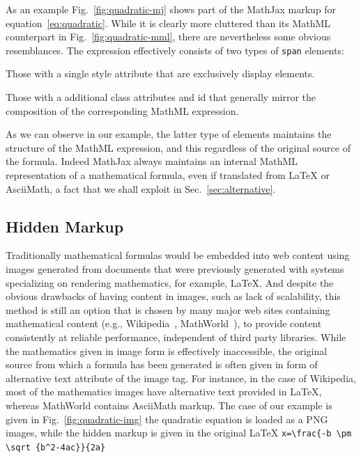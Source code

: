 \documentclass{sig-alternate}
\begin{document}
As an example Fig.~\ref{fig:quadratic-mj} shows part of the MathJax markup for
equation~\ref{eq:quadratic}. While it is clearly more cluttered than its MathML
counterpart in Fig.~\ref{fig:quadratic-mml}, there are nevertheless some obvious
resemblances. The expression effectively consists of two types of \texttt{span}
elements:
\begin{inparaenum}[(a)]
\item Those with a single style attribute that are exclusively display elements.
\item Those with a additional class attributes and id that generally mirror the
  composition of the corresponding MathML expression.
\end{inparaenum}
As we can observe in our example, the latter type of elements maintains the
structure of the MathML expression, and this regardless of the original source
of the formula. Indeed MathJax always maintains an internal MathML
representation of a mathematical formula, even if translated from {\LaTeX} or
AsciiMath, a fact that we shall exploit in Sec.~\ref{sec:alternative}.


\subsection{Hidden Markup}\label{sec:images}

Traditionally mathematical formulas would be embedded into web content using
images generated from documents that were previously generated with systems
specializing on rendering mathematics, for example, {\LaTeX}. And despite the
obvious drawbacks of having content in images, such as lack of scalability, this
method is still an option that is chosen by many major web sites containing
mathematical content (e.g., Wikipedia~\cite{wikipedia},
MathWorld~\cite{mathworld}), to provide content consistently at reliable
performance, independent of third party libraries.  While the mathematics given
in image form is effectively inaccessible, the original source from which a
formula has been generated is often given in form of alternative text attribute
of the image tag.  For instance, in the case of Wikipedia, most of the
mathematics images have alternative text provided in \LaTeX, whereas MathWorld
contains AsciiMath markup.  The case of our example is given in
Fig.~\ref{fig:quadratic-img} the quadratic equation is loaded as a PNG images,
while the hidden markup is given in the original \LaTeX
\verb+x=\frac{-b \pm \sqrt {b^2-4ac}}{2a}+
\end{document}
